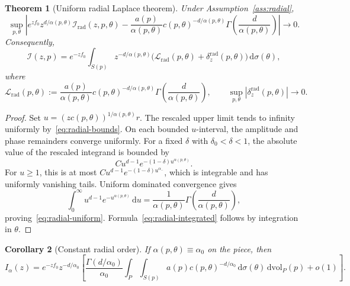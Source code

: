 \documentclass[11pt]{amsart}
\numberwithin{equation}{section}
\newtheorem{theorem}{Theorem}[section]
\newtheorem{corollary}[theorem]{Corollary}
\theoremstyle{definition}
\theoremstyle{remark}
\newcommand{\dd}{\,\mathrm{d}}
\newcommand{\dvol}{\,\mathrm{dvol}}
\newcommand{\cI}{\mathcal{I}}
\newcommand{\cL}{\mathcal{L}}
\begin{document}
\begin{theorem}[Uniform radial Laplace theorem]\label{thm:radial}
Under Assumption~\ref{ass:radial},
\begin{equation}\label{eq:radial-uniform}
 \sup_{p,\theta}\left|
 e^{zf_0}z^{d/\alpha(p,\theta)}\cI_{\mathrm{rad}}(z,p,\theta)
 -\frac{a(p)}{\alpha(p,\theta)}
  c(p,\theta)^{-d/\alpha(p,\theta)}
  \Gamma\left(\frac{d}{\alpha(p,\theta)}\right)
 \right|\longrightarrow0.
\end{equation}
Consequently,
\begin{equation}\label{eq:radial-integrated}
 \cI(z,p)=e^{-zf_0}\int_{S(p)}
 z^{-d/\alpha(p,\theta)}
 \bigl(\cL_{\mathrm{rad}}(p,\theta)+\delta^{\mathrm{rad}}_z(p,\theta)\bigr)\dd\sigma(\theta),
\end{equation}
where
\begin{equation}\label{eq:radial-coefficient}
 \cL_{\mathrm{rad}}(p,\theta):=
 \frac{a(p)}{\alpha(p,\theta)}
 c(p,\theta)^{-d/\alpha(p,\theta)}
 \Gamma\left(\frac{d}{\alpha(p,\theta)}\right),
 \qquad
 \sup_{p,\theta}|\delta^{\mathrm{rad}}_z(p,\theta)|\to0.
\end{equation}
\end{theorem}

\begin{proof}
Set
$u=(zc(p,\theta))^{1/\alpha(p,\theta)}r$.  The rescaled upper limit tends to
infinity uniformly by~\eqref{eq:radial-bounds}.  On each bounded $u$-interval,
the amplitude and phase remainders converge uniformly.  For a fixed
$\delta$ with $\delta_0<\delta<1$, the absolute value of the rescaled
integrand is bounded by
\[
 C u^{d-1}e^{-(1-\delta)u^{\alpha(p,\theta)}}.
\]
For $u\ge1$, this is at most
$Cu^{d-1}e^{-(1-\delta)u^{\alpha_-}}$, which is integrable and has uniformly
vanishing tails.  Uniform dominated convergence gives
\[
 \int_0^\infty u^{d-1}e^{-u^{\alpha(p,\theta)}}\dd u
 =\frac1{\alpha(p,\theta)}
  \Gamma\left(\frac d{\alpha(p,\theta)}\right),
\]
proving~\eqref{eq:radial-uniform}.  Formula~\eqref{eq:radial-integrated}
follows by integration in $\theta$.
\end{proof}

\begin{corollary}[Constant radial order]\label{cor:constant-radial}
If $\alpha(p,\theta)\equiv\alpha_0$ on the piece, then
\begin{equation}\label{eq:constant-radial-result}
 I_\alpha(z)=e^{-zf_0}z^{-d/\alpha_0}
 \left[
 \frac{\Gamma(d/\alpha_0)}{\alpha_0}
 \int_P\int_{S(p)}a(p)c(p,\theta)^{-d/\alpha_0}
 \dd\sigma(\theta)\dvol_P(p)+o(1)
 \right].
\end{equation}
\end{corollary}
\end{document}
